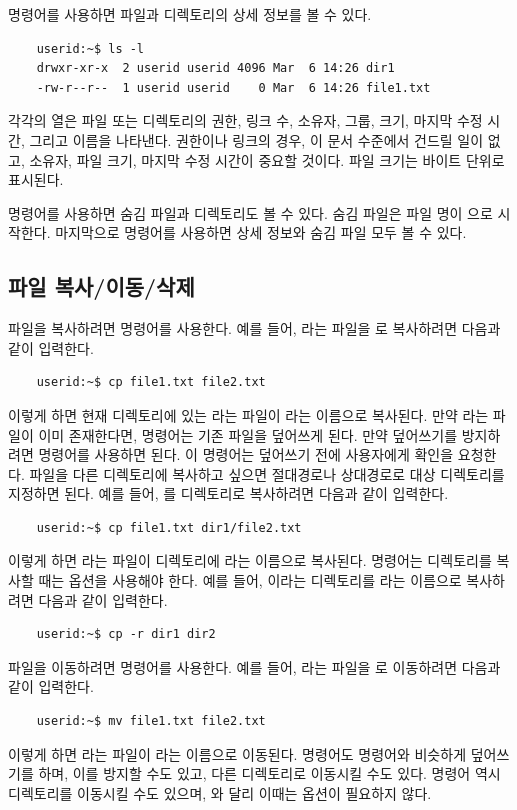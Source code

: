 { 명령어를 사용하면 파일과 디렉토리의 상세 정보를 볼 수 있다. 
\begin{lstlisting}
    userid:~$ ls -l
    drwxr-xr-x  2 userid userid 4096 Mar  6 14:26 dir1
    -rw-r--r--  1 userid userid    0 Mar  6 14:26 file1.txt
\end{lstlisting}
각각의 열은 파일 또는 디렉토리의 권한, 링크 수, 소유자, 그룹, 크기, 마지막 수정 시간, 그리고 이름을 나타낸다. 권한이나 링크의 경우, 이 문서 수준에서 건드릴 일이 없고, 소유자, 파일 크기, 마지막 수정 시간이 중요할 것이다. 파일 크기는 바이트 단위로 표시된다.

 명령어를 사용하면 숨김 파일과 디렉토리도 볼 수 있다. 숨김 파일은 파일 명이 으로 시작한다. 마지막으로  명령어를 사용하면 상세 정보와 숨김 파일 모두 볼 수 있다.

\subsection{파일 복사/이동/삭제}

파일을 복사하려면  명령어를 사용한다. 예를 들어, 라는 파일을 로 복사하려면 다음과 같이 입력한다.
\begin{lstlisting}
    userid:~$ cp file1.txt file2.txt
\end{lstlisting}
이렇게 하면 현재 디렉토리에 있는 라는 파일이 라는 이름으로 복사된다. 만약 라는 파일이 이미 존재한다면,  명령어는 기존 파일을 덮어쓰게 된다. 만약 덮어쓰기를 방지하려면  명령어를 사용하면 된다. 이 명령어는 덮어쓰기 전에 사용자에게 확인을 요청한다. 파일을 다른 디렉토리에 복사하고 싶으면 절대경로나 상대경로로 대상 디렉토리를 지정하면 된다. 예를 들어, 를  디렉토리로 복사하려면 다음과 같이 입력한다.
\begin{lstlisting}
    userid:~$ cp file1.txt dir1/file2.txt
\end{lstlisting}
이렇게 하면 라는 파일이  디렉토리에 라는 이름으로 복사된다.  명령어는 디렉토리를 복사할 때는  옵션을 사용해야 한다. 예를 들어, 이라는 디렉토리를 라는 이름으로 복사하려면 다음과 같이 입력한다.
\begin{lstlisting}
    userid:~$ cp -r dir1 dir2
\end{lstlisting}

파일을 이동하려면  명령어를 사용한다. 예를 들어, 라는 파일을 로 이동하려면 다음과 같이 입력한다.
\begin{lstlisting}
    userid:~$ mv file1.txt file2.txt
\end{lstlisting}
이렇게 하면 라는 파일이 라는 이름으로 이동된다.  명령어도  명령어와 비슷하게 덮어쓰기를 하며, 이를 방지할 수도 있고, 다른 디렉토리로 이동시킬 수도 있다.  명령어 역시 디렉토리를 이동시킬 수도 있으며, 와 달리 이때는  옵션이 필요하지 않다.

}
